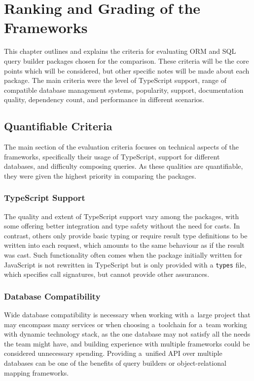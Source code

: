 \chapter{Ranking and Grading of the Frameworks}

This chapter outlines and explains the criteria for evaluating ORM and SQL query
builder packages chosen for the comparison. These criteria will be the core
points which will be considered, but other specific notes will be made about
each package. The main criteria were the level of TypeScript support, range of
compatible database management systems, popularity, support, documentation
quality, dependency count, and performance in different scenarios.

\section{Quantifiable Criteria}

The main section of the evaluation criteria focuses on technical aspects of the
frameworks, specifically their usage of TypeScript, support for different
databases, and difficulty composing queries. As these qualities are
quantifiable, they were given the highest priority in comparing the packages.

\subsection{TypeScript Support}

The quality and extent of TypeScript support vary among the packages, with some
offering better integration and type safety without the need for casts. In
contrast, others only provide basic typing or require result type definitions to
be written into each request, which amounts to the same behaviour as if the
result was cast. Such functionality often comes when the package initially
written for JavaScript is not rewritten in TypeScript but is only provided with
a \texttt{types} file, which specifies call signatures, but cannot provide other
assurances.

\subsection{Database Compatibility}

Wide database compatibility is necessary when working with a~large project that
may encompass many services or when choosing a~toolchain for a~team working with
dynamic technology stack, as the one database may not satisfy all the needs the
team might have, and building experience with multiple frameworks could be
considered unnecessary spending. Providing a~unified API over multiple databases
can be one of the benefits of query builders or object-relational mapping
frameworks.

